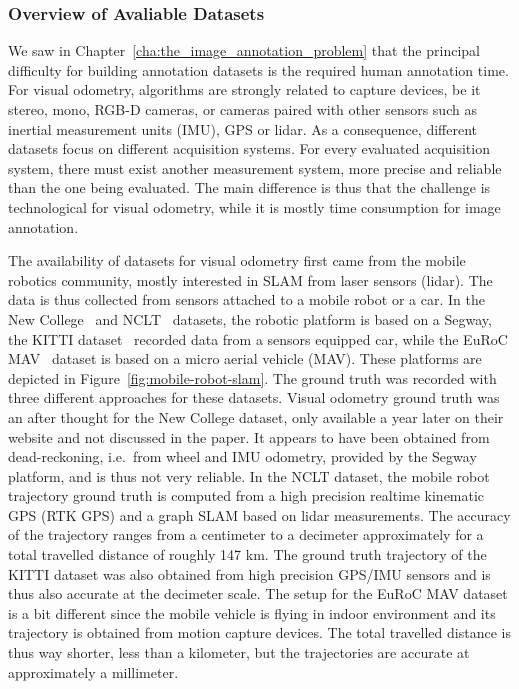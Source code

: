 \subsubsection{Overview of Avaliable Datasets}%
\label{ssub:datasets_overview}

We saw in Chapter~\ref{cha:the_image_annotation_problem} that the principal
difficulty for building annotation datasets is the required human annotation time.
For visual odometry, algorithms are strongly related to capture devices,
be it stereo, mono, RGB-D cameras, or cameras paired with other sensors
such as inertial measurement units (IMU), GPS or lidar.
As a consequence, different datasets focus on different acquisition systems.
For every evaluated acquisition system, there must exist another measurement system,
more precise and reliable than the one being evaluated.
The main difference is thus that
the challenge is technological for visual odometry,
while it is mostly time consumption for image annotation.

The availability of datasets for visual odometry first came from the mobile robotics community,
mostly interested in SLAM from laser sensors (lidar).
The data is thus collected from sensors attached to a mobile robot or a car.
In the New College~\cite{smith2009new} and NCLT~\cite{carlevaris2016university} datasets,
the robotic platform is based on a Segway, the KITTI dataset~\cite{geiger2013vision}
recorded data from a sensors equipped car,
while the EuRoC MAV~\cite{burri2016euroc}
dataset is based on a micro aerial vehicle (MAV).
These platforms are depicted in Figure~\ref{fig:mobile-robot-slam}.
The ground truth was recorded with three different approaches for these datasets.
Visual odometry ground truth was an after thought for the New College dataset,
only available a year later on their website and not discussed in the paper.
It appears to have been obtained from dead-reckoning, i.e.\ from wheel and IMU odometry,
provided by the Segway platform, and is thus not very reliable.
In the NCLT dataset, the mobile robot trajectory ground truth is computed from
a high precision realtime kinematic GPS (RTK GPS) and a graph SLAM based on lidar measurements.
The accuracy of the trajectory ranges from a centimeter to a decimeter approximately for a total
travelled distance of roughly 147 km.
The ground truth trajectory of the KITTI dataset was also obtained from high precision
GPS/IMU sensors and is thus also accurate at the decimeter scale.
The setup for the EuRoC MAV dataset is a bit different since the mobile vehicle
is flying in indoor environment and its trajectory is obtained from motion capture devices.
The total travelled distance is thus way shorter, less than a kilometer,
but the trajectories are accurate at approximately a millimeter.

